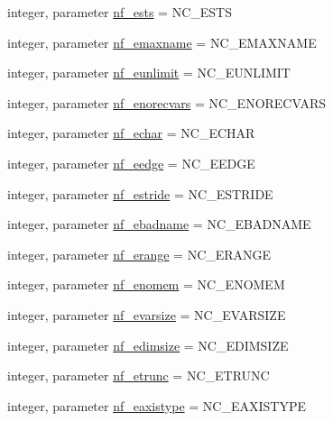 \begin{DoxyCompactItemize}
\item 
integer, parameter \hyperlink{namespacenetcdf__nf__data_a9a4217c866473f8f7ef5e22c536fd9aa}{nf\+\_\+ests} = N\+C\+\_\+\+E\+S\+TS
\item 
integer, parameter \hyperlink{namespacenetcdf__nf__data_ad1f3f1c5e89739c4629d73aa6ddac320}{nf\+\_\+emaxname} = N\+C\+\_\+\+E\+M\+A\+X\+N\+A\+ME
\item 
integer, parameter \hyperlink{namespacenetcdf__nf__data_a023bee57138b413b8c8c363bd7d9d25f}{nf\+\_\+eunlimit} = N\+C\+\_\+\+E\+U\+N\+L\+I\+M\+IT
\item 
integer, parameter \hyperlink{namespacenetcdf__nf__data_aa5ac3777afc47e099eccec585f9ef8ff}{nf\+\_\+enorecvars} = N\+C\+\_\+\+E\+N\+O\+R\+E\+C\+V\+A\+RS
\item 
integer, parameter \hyperlink{namespacenetcdf__nf__data_a6b8d3f930f91dcd4c9ceea47452fd11a}{nf\+\_\+echar} = N\+C\+\_\+\+E\+C\+H\+AR
\item 
integer, parameter \hyperlink{namespacenetcdf__nf__data_aa1d5011ddf9c06b954161ad52b0d5516}{nf\+\_\+eedge} = N\+C\+\_\+\+E\+E\+D\+GE
\item 
integer, parameter \hyperlink{namespacenetcdf__nf__data_ae24b92b5a7828b150aa050e6c70b8a17}{nf\+\_\+estride} = N\+C\+\_\+\+E\+S\+T\+R\+I\+DE
\item 
integer, parameter \hyperlink{namespacenetcdf__nf__data_a16e1cb2dc360db0353072ec35b03f232}{nf\+\_\+ebadname} = N\+C\+\_\+\+E\+B\+A\+D\+N\+A\+ME
\item 
integer, parameter \hyperlink{namespacenetcdf__nf__data_a75a25a80c5f8974464999a47389737af}{nf\+\_\+erange} = N\+C\+\_\+\+E\+R\+A\+N\+GE
\item 
integer, parameter \hyperlink{namespacenetcdf__nf__data_aa417fbc2f2916ce82a24afaa423f4b49}{nf\+\_\+enomem} = N\+C\+\_\+\+E\+N\+O\+M\+EM
\item 
integer, parameter \hyperlink{namespacenetcdf__nf__data_abfc9de7f63b46d3bd7c239e0ca9118a4}{nf\+\_\+evarsize} = N\+C\+\_\+\+E\+V\+A\+R\+S\+I\+ZE
\item 
integer, parameter \hyperlink{namespacenetcdf__nf__data_a8185d116977ecbf524ef2dbdb9694c82}{nf\+\_\+edimsize} = N\+C\+\_\+\+E\+D\+I\+M\+S\+I\+ZE
\item 
integer, parameter \hyperlink{namespacenetcdf__nf__data_a02d860091caaa38ac7044f3920366b5c}{nf\+\_\+etrunc} = N\+C\+\_\+\+E\+T\+R\+U\+NC
\item 
integer, parameter \hyperlink{namespacenetcdf__nf__data_a7b63825166c22986986ee0b76e587990}{nf\+\_\+eaxistype} = N\+C\+\_\+\+E\+A\+X\+I\+S\+T\+Y\+PE

\end{DoxyCompactItemize}
